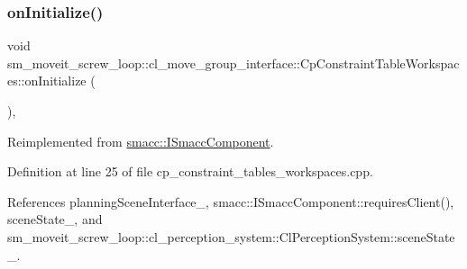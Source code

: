 \subsubsection{\texorpdfstring{on\+Initialize()}{onInitialize()}}
{\footnotesize\ttfamily void sm\+\_\+moveit\+\_\+screw\+\_\+loop\+::cl\+\_\+move\+\_\+group\+\_\+interface\+::\+Cp\+Constraint\+Table\+Workspaces\+::on\+Initialize (\begin{DoxyParamCaption}{ }\end{DoxyParamCaption})\hspace{0.3cm}{\ttfamily [override]}, {\ttfamily [virtual]}}



Reimplemented from \hyperlink{classsmacc_1_1ISmaccComponent_ae6f71d008db12553912e9436184b9e65}{smacc\+::\+I\+Smacc\+Component}.



Definition at line 25 of file cp\+\_\+constraint\+\_\+tables\+\_\+workspaces.\+cpp.



References planning\+Scene\+Interface\+\_\+, smacc\+::\+I\+Smacc\+Component\+::requires\+Client(), scene\+State\+\_\+, and sm\+\_\+moveit\+\_\+screw\+\_\+loop\+::cl\+\_\+perception\+\_\+system\+::\+Cl\+Perception\+System\+::scene\+State\+\_\+.


